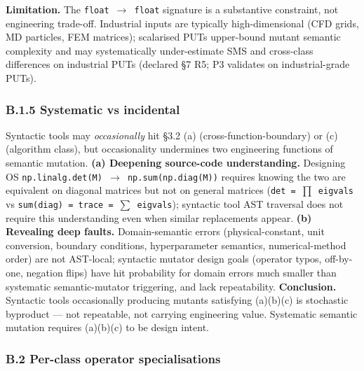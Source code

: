 \documentclass[review,12pt,authoryear]{elsarticle}
\begin{document}
\textbf{Limitation.} The \texttt{float\ $\to$\ float} signature is a
substantive constraint, not engineering trade-off. Industrial inputs are
typically high-dimensional (CFD grids, MD particles, FEM matrices);
scalarised PUTs upper-bound mutant semantic complexity and may
systematically under-estimate SMS and cross-class differences on
industrial PUTs (declared §7 R5; P3 validates on industrial-grade PUTs).

\subsubsection{B.1.5 Systematic vs incidental}\label{b.1.5-systematic-vs-incidental}

Syntactic tools may \emph{occasionally} hit §3.2 (a)
(cross-function-boundary) or (c) (algorithm class), but occasionality
undermines two engineering functions of semantic mutation. \textbf{(a)
Deepening source-code understanding.} Designing OS
\texttt{np.linalg.det(M)\ $\to$\ np.sum(np.diag(M))} requires knowing the
two are equivalent on diagonal matrices but not on general matrices
(\texttt{det\ =\ $\prod$\ eigvals} vs
\texttt{sum(diag)\ =\ trace\ =\ $\sum$\ eigvals}); syntactic tool AST
traversal does not require this understanding even when similar
replacements appear. \textbf{(b) Revealing deep faults.}
Domain-semantic errors (physical-constant, unit conversion, boundary
conditions, hyperparameter semantics, numerical-method order) are not
AST-local; syntactic mutator design goals (operator typos, off-by-one,
negation flips) have hit probability for domain errors much smaller than
systematic semantic-mutator triggering, and lack repeatability.
\textbf{Conclusion.} Syntactic tools occasionally producing mutants
satisfying (a)(b)(c) is stochastic byproduct --- not repeatable, not
carrying engineering value. Systematic semantic mutation requires
(a)(b)(c) to be design intent.

\subsubsection{B.2 Per-class operator specialisations}\label{b.2-per-class-operator-specialisations}
\end{document}
